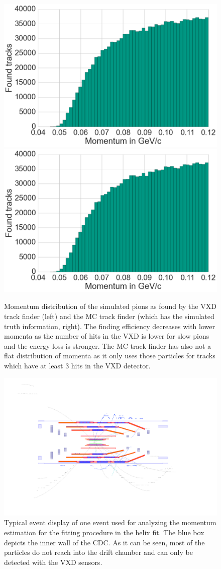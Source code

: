 \begin{figure}
 \centering
 \includegraphics[width=0.48\linewidth]{figures/vxd/finding_efficiency.png}
 \includegraphics[width=0.48\linewidth]{figures/vxd/finding_efficiency.png}
 \caption[Momentum distribution of the found and simulated pions.]{Momentum distribution of the simulated pions as found by the VXD track finder (left) and the MC track finder (which has the simulated truth information, right). The finding efficiency decreases with lower momenta as the number of hits in the VXD is lower for slow pions and the energy loss is stronger. The MC track finder has also not a flat distribution of momenta as it only uses those particles for tracks which have at least 3 hits in the VXD detector.}
 \label{fig-vxd-finding-efficiency}
\end{figure}

\begin{figure}
 \centering
 \includegraphics[width=0.8\linewidth]{figures/vxd/event_display.png}
 \caption[Typical event display of slow pions.]{Typical event display of one event used for analyzing the momentum estimation for the fitting procedure in the helix fit. The blue box depicts the inner wall of the CDC. As it can be seen, most of the particles do not reach into the drift chamber and can only be detected with the VXD sensors.}
 \label{fig-vxd-event-display}
\end{figure}

